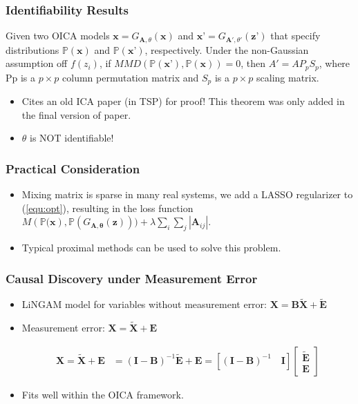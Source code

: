 \documentclass{beamer}
\begin{document}
\begin{frame}
\frametitle{Identifiability Results}
\begin{theorem}
Given two OICA models $\textbf{x}=G_{\mathbf{A}, \theta}(\textbf{x})$ and $\textbf{x'} = G_{\mathbf{A'}, \theta'}(\textbf{z'})$ that specify distributions $\mathbb{P}(\textbf{x})$ and $\mathbb{P}(\textbf{x'})$, respectively.  Under the non-Gaussian assumption off $f(z_i)$, if $MMD(\mathbb{P}(\textbf{x'}),\mathbb{P}(\textbf{x})) = 0$, then $A'=AP_pS_p$, where Pp is a $p\times p$ column permutation matrix and $S_p$ is a $p\times p$ scaling matrix.
\end{theorem}
\begin{itemize}
\item
Cites an old ICA paper (in TSP) for proof! This theorem was only added in the final version of paper.\\
\pause
\item
$\theta$ is NOT identifiable!
\end{itemize}
\end{frame}

\begin{frame}
\frametitle{Practical Consideration}
\begin{itemize}
\item
Mixing matrix is sparse in many real systems, we add a LASSO regularizer to (\ref{equ:opt}), resulting in the loss function $M\left(\mathbb{P}(\mathbf{x}\right), \mathbb{P}(G_{\mathbf{A}, \boldsymbol{\theta}}(\mathbf{z})))+\lambda \sum_i\sum_j|\mathbf{A}_{ij}|$.

\item 
Typical proximal methods can be used to solve this problem.
\end{itemize}
\end{frame}


\begin{frame}
\frametitle{Causal Discovery under Measurement Error}
\begin{itemize}
\item
LiNGAM model for variables without measurement error:
$\textbf{X} = \mathbf{B}\mathbf{\tilde{X}} + \mathbf{\tilde{E}}$
\item Measurement error:
$\textbf{X} = \mathbf{\tilde{X}} + \textbf{E}$

\begin{align}
\label{equ:measurementerror}
\mathbf{X} = \tilde{\mathbf{X}} + \mathbf{E}&=(\mathbf{I}-\mathbf{B})^{-1} \tilde{\mathbf{E}} +\mathbf{E}
=\left[(\mathbf{I}-\mathbf{B})^{-1}\quad \mathbf{I}\right]\left[\begin{array}{c}
\tilde{\mathbf{E}}\\
\mathbf{E}
\end{array}\right]
\end{align}

\item Fits well within the OICA framework.
\end{itemize}
\end{frame}
\end{document}
